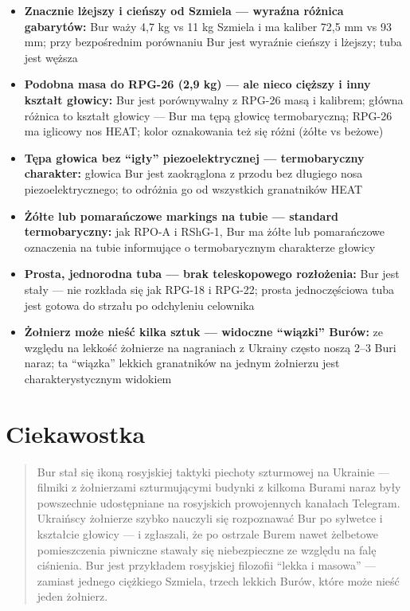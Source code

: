 \documentclass[12pt,openany,oneside]{book}
\providecommand{\tightlist}{%
  \setlength{\itemsep}{0pt}\setlength{\parskip}{0pt}}
\begin{document}
\begin{itemize}
\tightlist
\item
  \textbf{Znacznie lżejszy i cieńszy od Szmiela --- wyraźna różnica
  gabarytów:} Bur waży 4,7 kg vs 11 kg Szmiela i ma kaliber 72,5 mm vs
  93 mm; przy bezpośrednim porównaniu Bur jest wyraźnie cieńszy i
  lżejszy; tuba jest węższa
\item
  \textbf{Podobna masa do RPG-26 (2,9 kg) --- ale nieco cięższy i inny
  kształt głowicy:} Bur jest porównywalny z RPG-26 masą i kalibrem;
  główna różnica to kształt głowicy --- Bur ma tępą głowicę
  termobaryczną; RPG-26 ma iglicowy nos HEAT; kolor oznakowania też się
  różni (żółte vs beżowe)
\item
  \textbf{Tępa głowica bez ``igły'' piezoelektrycznej --- termobaryczny
  charakter:} głowica Bur jest zaokrąglona z przodu bez długiego nosa
  piezoelektrycznego; to odróżnia go od wszystkich granatników HEAT
\item
  \textbf{Żółte lub pomarańczowe markings na tubie --- standard
  termobaryczny:} jak RPO-A i RShG-1, Bur ma żółte lub pomarańczowe
  oznaczenia na tubie informujące o termobarycznym charakterze głowicy
\item
  \textbf{Prosta, jednorodna tuba --- brak teleskopowego rozłożenia:}
  Bur jest stały --- nie rozkłada się jak RPG-18 i RPG-22; prosta
  jednoczęściowa tuba jest gotowa do strzału po odchyleniu celownika
\item
  \textbf{Żołnierz może nieść kilka sztuk --- widoczne ``wiązki''
  Burów:} ze względu na lekkość żołnierze na nagraniach z Ukrainy często
  noszą 2--3 Buri naraz; ta ``wiązka'' lekkich granatników na jednym
  żołnierzu jest charakterystycznym widokiem
\end{itemize}

\section{Ciekawostka}\label{ciekawostka-78}

\begin{quote}
Bur stał się ikoną rosyjskiej taktyki piechoty szturmowej na Ukrainie
--- filmiki z żołnierzami szturmującymi budynki z kilkoma Burami naraz
były powszechnie udostępniane na rosyjskich prowojennych kanałach
Telegram. Ukraińscy żołnierze szybko nauczyli się rozpoznawać Bur po
sylwetce i kształcie głowicy --- i zgłaszali, że po ostrzale Burem nawet
żelbetowe pomieszczenia piwniczne stawały się niebezpieczne ze względu
na falę ciśnienia. Bur jest przykładem rosyjskiej filozofii ``lekka i
masowa'' --- zamiast jednego ciężkiego Szmiela, trzech lekkich Burów,
które może nieść jeden żołnierz.
\end{quote}
\end{document}
